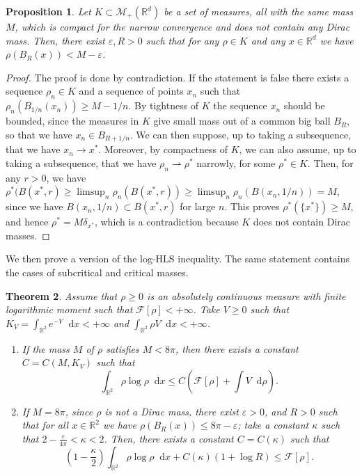 \documentclass[11pt,a4paper]{article}
\numberwithin{equation}{section}
\newcommand{\R}{{\mathbb{R}}}
\theoremstyle{plain}
\newtheorem{theorem}{Theorem}[section]
\newtheorem{proposition}[theorem]{Proposition}
\theoremstyle{remark}
\newcommand {\f}{\frac}
\newcommand{\diff}{\mathop{}\!\mathrm{d}}
\newcommand{\ve}{\varepsilon}
\begin{document}
\begin{proposition}
    Let $K\subset\mathcal M_+(\R^d)$ be a set of measures, all with the same mass $M$, which is compact for the narrow convergence and does not contain any Dirac mass. Then, there exist $\ve,R>0$ such that for any $\rho\in K$ and any $x\in\R^d$ we have $\rho(B_R(x))<M-\ve$.
\end{proposition}
\begin{proof}
    The proof is done by contradiction. If the statement is false there exists a sequence $\rho_n\in K$ and a sequence of points $x_n$ such that  $\rho_n(B_{1/n}(x_n))\ge M - 1/n$. By tightness of $K$ the sequence $x_n$ should be bounded, since the measures in $K$ give small mass out of a common big ball $B_R$, so that we have $x_n\in B_{R+1/n}$. We can then suppose, up to taking a subsequence, that we have $x_n\to x^*$. Moreover, by compactness of $K$, we can also assume, up to taking a subsequence, that we have $\rho_{n}\rightharpoonup\rho^*$ narrowly, for some $\rho^*\in K$. Then, for any $r>0$, we have $\rho^*(B(x^*,r)\geq \limsup_n \rho_n(B(x^*,r))\geq \limsup_n \rho_n(B(x_n,1/n))=M$, since we have $B(x_n,1/n)\subset B(x^*,r)$ for large $n$. This proves $\rho^*(\{x^*\})\geq M$, and hence $\rho^*=M\delta_{x^*}$, which is a contradiction because $K$ does not contain Dirac masses.
\end{proof}
We then prove a version of the log-HLS inequality. The same statement contains the cases of subcritical and critical masses.

\begin{theorem}\label{thm:new_proof_hls}
Assume that $\rho\ge 0$ is an absolutely continuous measure with finite logarithmic moment such that $\mathcal{F}[\rho]<+\infty$. Take $V\ge0$ such that $K_V=\int_{\R^2}e^{-V}\diff x<+\infty$ and
$\int_{\R^2}\rho V\diff x<+\infty$.
\begin{enumerate}
    \item If the mass $M$ of $\rho$ satisfies $M<8\pi$, then there exists a constant $C=C(M,K_V)$ such that
    $$
        \int_{\R^2}\rho\log\rho\diff x\leq C \left(\mathcal{F}[\rho]+\int V\diff\rho \right).
    $$
    \item If $M=8\pi$, since $\rho$ is not a  Dirac mass,  there exist $\varepsilon>0$, and $R>0$ such that for all $x\in\R^2$ we have $\rho(
B_{R}(x))\leq 8\pi-\varepsilon$; take a constant $\kappa$ such that  $2 - \f{\varepsilon}{4\pi}<\kappa<2$. Then, there exists a constant $C=C(\kappa)$  such that
$$
\left(1-\frac{\kappa}{2}\right)\int_{\R^2}\rho\log\rho\diff x +  C(\kappa)(1+\log R)\le \mathcal{F}[\rho].
$$
\end{enumerate}
\end{theorem}
\end{document}
